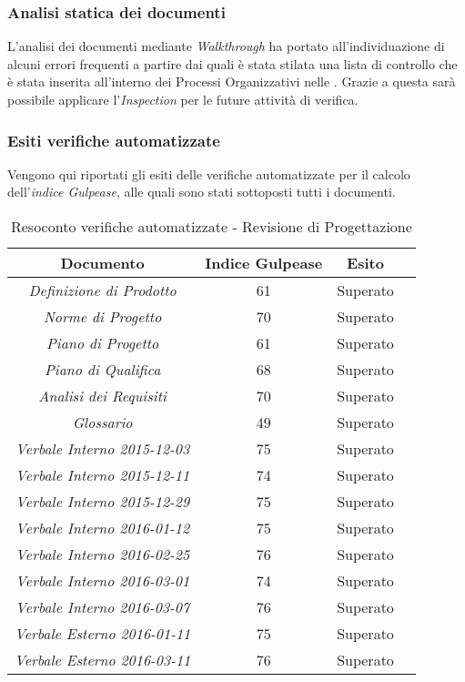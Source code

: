 \subsubsection{Analisi statica dei documenti}
L'analisi dei documenti mediante \textit{Walkthrough} ha portato all'individuazione di alcuni errori frequenti a partire dai quali è stata stilata una lista di controllo che è stata inserita all'interno dei Processi Organizzativi nelle \textit{\NdP}. Grazie a questa sarà possibile applicare l'\textit{Inspection} per le future attività di verifica.

\subsubsection{Esiti verifiche automatizzate}
Vengono qui riportati gli esiti delle verifiche automatizzate per il calcolo dell'\textit{indice Gulpease}, alle quali sono stati sottoposti tutti i documenti.
\begin{table}[h]
\begin{center}
\begin{tabular}{|c|c|c|c|}
\hline \textbf{Documento} & \textbf{Indice Gulpease} & \textbf{Esito}\\
\hline
\emph{Definizione di Prodotto} & 61 & Superato \\
\emph{Norme di Progetto} & 70 & Superato \\
\emph{Piano di Progetto} & 61 & Superato \\
\emph{Piano di Qualifica} & 68 & Superato \\
\emph{Analisi dei Requisiti} & 70 & Superato \\
\emph{Glossario} & 49 & Superato \\
\emph{Verbale Interno 2015-12-03} & 75 & Superato \\
\emph{Verbale Interno 2015-12-11} & 74 & Superato \\
\emph{Verbale Interno 2015-12-29} & 75 & Superato \\
\emph{Verbale Interno 2016-01-12} & 75 & Superato \\
\emph{Verbale Interno 2016-02-25} & 76 & Superato \\
\emph{Verbale Interno 2016-03-01} & 74 & Superato \\
\emph{Verbale Interno 2016-03-07} & 76 & Superato \\
\emph{Verbale Esterno 2016-01-11} & 75 & Superato \\
\emph{Verbale Esterno 2016-03-11} & 76 & Superato \\
\hline
\end{tabular}
\caption{Resoconto verifiche automatizzate - Revisione di Progettazione}
\end{center}
\end{table}

